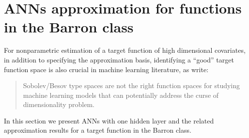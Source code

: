\documentclass[11pt]{article}
\numberwithin{equation}{section}
\begin{document}
\section{ANNs approximation for functions in the Barron class}\label{sec:ANN}


For nonparametric estimation of a target function of high dimensional covariates, in addition to specifying the approximation basis, identifying a ``good'' target function space is also crucial in machine learning literature, as \cite{e2022barron} write:
\begin{quote}
		Sobolev/Besov type spaces are not the right function spaces for studying machine learning models that can potentially address the curse of dimensionality problem.
\end{quote}
In this section we present ANNs with one hidden layer and the related approximation results for a target function in the Barron class.
\end{document}
